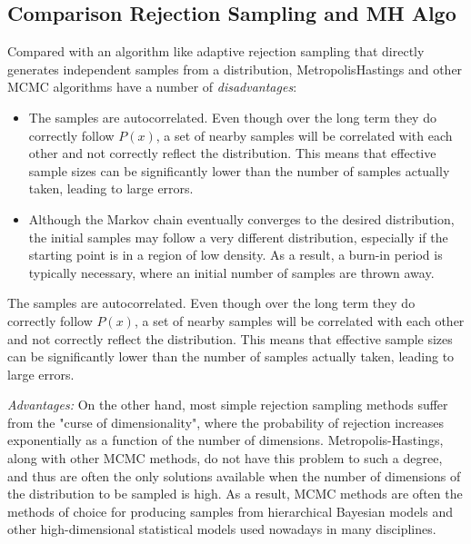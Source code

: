 \documentclass{article}
\begin{document}
\subsection{Comparison Rejection Sampling and MH Algo}
\newline
Compared with an algorithm like adaptive rejection sampling that directly generates independent samples from a distribution, MetropolisHastings and other MCMC algorithms have a number of \textit{disadvantages}:
\begin{itemize}
    \item The samples are autocorrelated. Even though over the long term they do correctly follow $P(x)$, a set of nearby samples will be correlated with each other and not correctly reflect the distribution. This means that effective sample sizes can be significantly lower than the number of samples actually taken, leading to large errors.
    \item Although the Markov chain eventually converges to the desired distribution, the initial samples may follow a very different distribution, especially if the starting point is in a region of low density. As a result, a burn-in period is typically necessary, where an initial number of samples are thrown away.

\end{itemize}
The samples are autocorrelated. Even though over the long term they do correctly follow $P(x)$, a set of nearby samples will be correlated with each other and not correctly reflect the distribution. This means that effective sample sizes can be significantly lower than the number of samples actually taken, leading to large errors.

\textit{Advantages:}
On the other hand, most simple rejection sampling methods suffer from the "curse of dimensionality", where the probability of rejection increases exponentially as a function of the number of dimensions. Metropolis-Hastings, along with other MCMC methods, do not have this problem to such a degree, and thus are often the only solutions available when the number of dimensions of the distribution to be sampled is high. As a result, MCMC methods are often the methods of choice for producing samples from hierarchical Bayesian models and other high-dimensional statistical models used nowadays in many disciplines.
\end{document}
